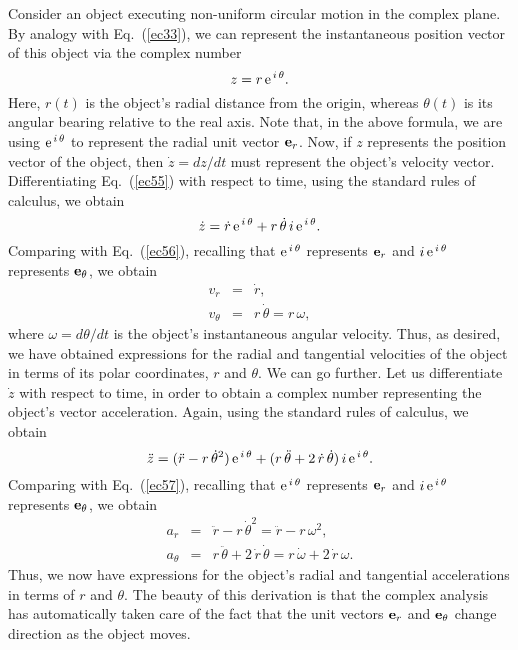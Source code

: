 Consider an object executing non-uniform circular motion in the complex plane. By analogy
with Eq.~(\ref{ec33}), we can represent the instantaneous position vector of
this object via the complex number
\begin{equation}
z = r\, {\rm e}^{\,i\,\theta}.\label{ec55}
\end{equation}
Here, $r(t)$ is the object's radial distance from the origin, whereas $\theta(t)$
is its angular bearing relative to the real axis. Note that, in the above formula, we are using
${\rm e}^{\,i\,\theta}$ to represent the radial unit vector ${\bf e}_r$. Now,
if $z$ represents the position vector of the object, then $\dot{z} = dz/dt$ must
represent the object's velocity vector. Differentiating Eq.~(\ref{ec55}) with
respect to time, using the standard rules of calculus, we obtain
\begin{equation}
\dot{z} = \dot{r}\,{\rm e}^{\,i\,\theta} + r\,\dot{\theta}\,i\,{\rm e}^{\,i\,\theta}.
\end{equation}
Comparing with Eq.~(\ref{ec56}), recalling that ${\rm e}^{\,i\,\theta}$ represents ${\bf e}_r$
and $i\,{\rm e}^{\,i\,\theta}$ represents ${\bf e}_\theta$, we obtain
\begin{eqnarray}
v_r &=& \dot{r},\label{e738}\\[0.5ex]
v_\theta &=& r\,\dot{\theta}=r\,\omega,\label{e739}
\end{eqnarray}
where $\omega = d\theta/dt$ is the object's instantaneous angular velocity. Thus,
as desired,
we have obtained expressions for the radial and tangential velocities of the
object in terms of its polar coordinates, $r$ and $\theta$.
We can go further. Let us differentiate $\dot{z}$ with respect to time,
in order to obtain a complex number representing the object's vector
acceleration. Again, using the standard rules of calculus, we obtain
\begin{equation}
\ddot{z} = (\ddot{r}-r\,\dot{\theta}^2)\,{\rm e}^{\,i\,\theta} + (r\,\ddot{\theta}+2\,\dot{r}\,
\dot{\theta})\,i\,{\rm e}^{\,i\,\theta}.
\end{equation}
Comparing with Eq.~(\ref{ec57}), recalling that ${\rm e}^{\,i\,\theta}$ represents ${\bf e}_r$
and $i\,{\rm e}^{\,i\,\theta}$ represents ${\bf e}_\theta$, we obtain
\begin{eqnarray}
a_r &=& \ddot{r}-r\,\dot{\theta}^2 = \ddot{r}-r\,\omega^2,\label{e741}\\[0.5ex]
a_\theta &=& r\,\ddot{\theta}+2\,\dot{r}\,
\dot{\theta} = r\,\dot{\omega} + 2\,\dot{r}\,\omega.\label{e742}
\end{eqnarray}
Thus, we now have expressions for the object's radial and tangential accelerations in terms
of $r$ and $\theta$. The beauty of this derivation is that the complex analysis
has automatically taken care of the fact that the unit vectors
${\bf e}_r$ and ${\bf e}_\theta$ change direction as the object moves.

